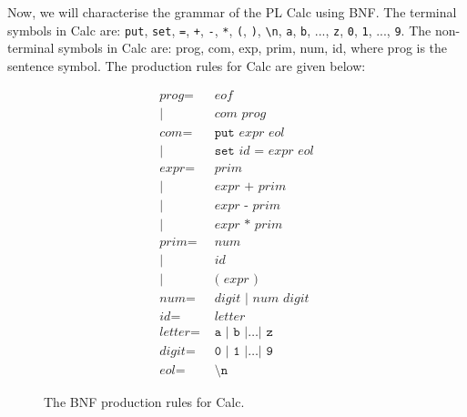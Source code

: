 \documentclass[a4paper, openany]{memoir}
\begin{document}
Now, we will characterise the grammar of the PL Calc using BNF. The terminal symbols in Calc are: \texttt{put}, \texttt{set}, \texttt{=}, \texttt{+}, \texttt{-}, \texttt{*}, \texttt{(}, \texttt{)}, \texttt{\textbackslash n}, \texttt{a}, \texttt{b}, ..., \texttt{z}, \texttt{0}, \texttt{1}, ..., \texttt{9}. The non-terminal symbols in Calc are: prog, com, exp, prim, num, id, where prog is the sentence symbol. The production rules for Calc are given below:
\begin{figure}[H]
    \begin{align*}
        \textit{prog} =& \textit{ eof} \\
        |\hspace{2pt} & \textit{ com prog} \\
        \textit{com} =& \texttt{ put} \textit{ expr eol} \\
        |\hspace{2pt} & \texttt{ set} \textit{ id } \texttt{=} \textit{ expr eol} \\
        \textit{expr} =& \textit{  prim} \\
        |\hspace{2pt} & \textit{ expr } \texttt{+} \textit{ prim} \\
        |\hspace{2pt} & \textit{ expr } \texttt{-} \textit{ prim} \\
        |\hspace{2pt} & \textit{ expr } \texttt{*} \textit{ prim} \\
        \textit{prim} =& \textit{ num} \\
        |\hspace{2pt} & \textit{ id} \\
        |\hspace{2pt} & \texttt{ (} \textit{ expr } \texttt{)} \\
        \textit{num} =& \textit{ digit } | \textit{ num digit} \\
        \textit{id} =& \textit{ letter} \\
        \textit{letter} =& \texttt{ a } | \texttt{ b } | \dots | \texttt{ z} \\
        \textit{digit} =& \texttt{ 0 } | \texttt{ 1 } | \dots | \texttt{ 9} \\
        \textit{eol} =& \texttt{ \textbackslash n}
    \end{align*}
    \caption{The BNF production rules for Calc.}
\end{figure}
\end{document}
